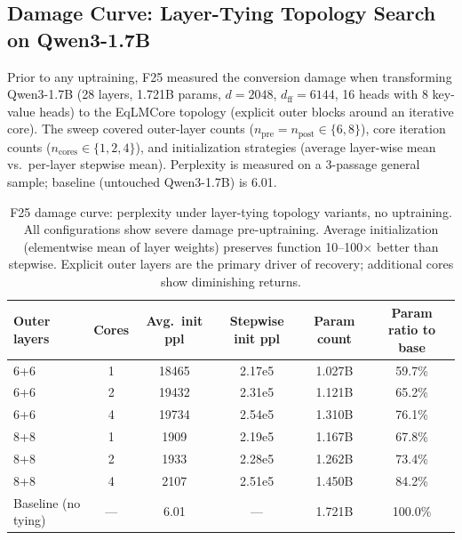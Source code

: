 \subsection{Damage Curve: Layer-Tying Topology Search on Qwen3-1.7B}

Prior to any uptraining, F25 measured the conversion damage when transforming Qwen3-1.7B (28 layers, 1.721B params, $d=2048$, $d_{\text{ff}}=6144$, 16 heads with 8 key-value heads) to the EqLMCore topology (explicit outer blocks around an iterative core). The sweep covered outer-layer counts ($n_{\mathrm{pre}} = n_{\mathrm{post}} \in \{6, 8\}$), core iteration counts ($n_{\mathrm{cores}} \in \{1, 2, 4\}$), and initialization strategies (average layer-wise mean vs.\ per-layer stepwise mean). Perplexity is measured on a 3-passage general sample; baseline (untouched Qwen3-1.7B) is 6.01.

\begin{table}[h]
\centering
\small
\caption{F25 damage curve: perplexity under layer-tying topology variants, no uptraining. All configurations show severe damage pre-uptraining. Average initialization (elementwise mean of layer weights) preserves function 10--100$\times$ better than stepwise. Explicit outer layers are the primary driver of recovery; additional cores show diminishing returns.}
\label{tab:damage_curve}
\begin{tabular}{@{}lccccc@{}}
\toprule
Outer layers & Cores & Avg.\ init ppl & Stepwise init ppl & Param count & Param ratio to base \\
\midrule
6+6 & 1 & 18465 & 2.17e5 & 1.027B & 59.7\% \\
6+6 & 2 & 19432 & 2.31e5 & 1.121B & 65.2\% \\
6+6 & 4 & 19734 & 2.54e5 & 1.310B & 76.1\% \\
8+8 & 1 & 1909 & 2.19e5 & 1.167B & 67.8\% \\
8+8 & 2 & 1933 & 2.28e5 & 1.262B & 73.4\% \\
8+8 & 4 & 2107 & 2.51e5 & 1.450B & 84.2\% \\
\midrule
Baseline (no tying) & --- & 6.01 & --- & 1.721B & 100.0\% \\
\bottomrule
\end{tabular}
\end{table}

